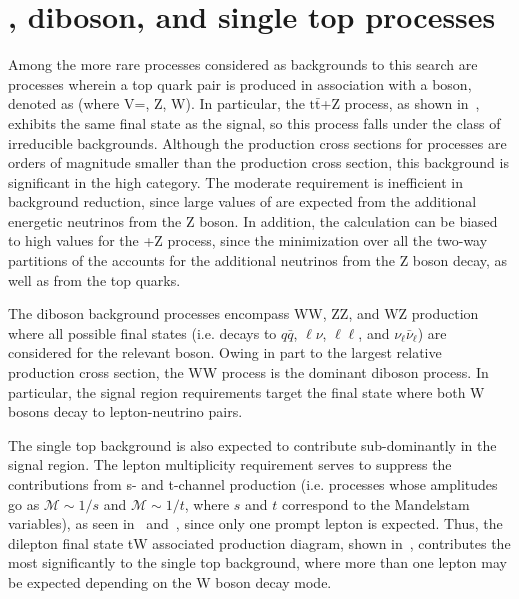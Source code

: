 \section{\ttV, diboson, and single top processes}
\label{sec:ttVetc}

Among the more rare processes considered as backgrounds to this search are processes wherein a top quark pair is produced in association with a boson, denoted as \ttV (where V=\gamma, Z, W). In particular, the $\mathrm{t\bar{t}}$+Z process, as shown in~, exhibits the same final state as the signal, so this process falls under the class of irreducible backgrounds. Although the production cross sections for \ttV processes are orders of magnitude smaller than the \ttbar production cross section, this background is significant in the high \mttll category. The moderate \ptmiss requirement is inefficient in \ttV background reduction, since large values of \MET are expected from the additional energetic neutrinos from the Z boson. In addition, the \mttll calculation can be biased to high values for the \ttbar+Z process, since the minimization over all the two-way partitions of the \MET accounts for the additional neutrinos from the Z boson decay, as well as from the top quarks.

The diboson background processes encompass WW, ZZ, and WZ production where all possible final states (i.e. decays to $q\bar{q}$, $\ell\nu$, $\ell\ell$, and $\nu_\ell\bar{\nu}_\ell$) are considered for the relevant boson. Owing in part to the largest relative production cross section, the WW process is the dominant diboson process. In particular, the signal region requirements target the final state where both W bosons decay to lepton-neutrino pairs. 
 
The single top background is also expected to contribute sub-dominantly in the signal region. The lepton multiplicity requirement serves to suppress the contributions from s- and t-channel production (i.e. processes whose amplitudes go as $\mathscr{M}\sim 1/s$ and $\mathscr{M}\sim 1/t$, where $s$ and $t$ correspond to the Mandelstam variables), as seen in~ and~, since only one prompt lepton is expected. Thus, the dilepton final state tW associated production diagram, shown in~, contributes the most significantly to the single top background, where more than one lepton may be expected depending on the W boson decay mode.  

